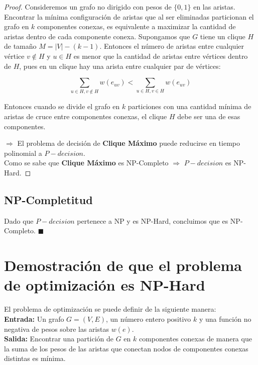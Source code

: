 \begin{proof}
    


Consideremos un grafo no dirigido con pesos de $\{0,1\}$ en las aristas. 
Encontrar la mínima configuración de aristas que al ser eliminadas particionan 
el grafo en $k$ componentes conexas, es equivalente a maximizar la cantidad de aristas 
dentro de cada componente conexa. Supongamos que $G$ tiene un clique $H$ de tamaño $M = |V| - (k-1)$.
Entonces el número de aristas entre cualquier vértice $v \notin H$ y $u \in H$ es menor que la 
cantidad de aristas entre vértices dentro de $H$, pues en un clique hay una arista entre cualquier
par de vértices:


\[
    \sum_{u \in H, v \notin H}w(e_{uv}) < \sum_{u \in H, v \in H} w(e_{uv})
\]

Entonces cuando se divide el grafo en $k$ particiones con una cantidad mínima de aristas de cruce entre componentes conexas, el clique $H$ debe ser una de esas componentes.

$\Rightarrow$ El problema de decisión de \textbf{Clique Máximo} puede reducirse en tiempo polinomial a $P-decision$. \\
Como se sabe que \textbf{Clique Máximo} es NP-Completo $\Rightarrow$ $P-decision$ es NP-Hard.

\end{proof}

\subsection{NP-Completitud}

Dado que $P-decision$ pertenece a NP y es NP-Hard, concluimos que es NP-Completo. $\blacksquare$


\section{Demostración de que el problema de optimización es NP-Hard}

El problema de optimización se puede definir de la siguiente manera:\\

\textbf{Entrada:} Un grafo \( G = (V, E) \), un número entero positivo \( k \) y 
una función no negativa de pesos sobre las aristas $w(e)$.\\

\textbf{Salida:} Encontrar una partición de \( G \) en \( k \) componentes conexas de manera que 
la suma de los pesos de las aristas que conectan nodos de componentes conexas distintas es mínima.\\

